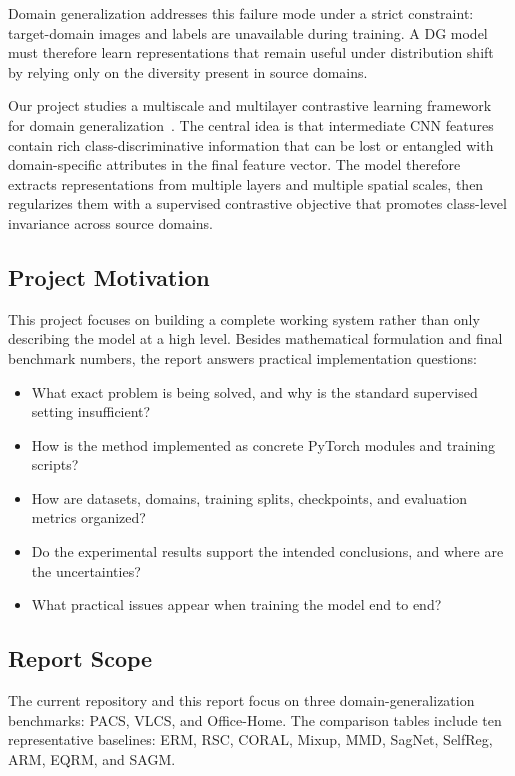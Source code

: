 \documentclass[11pt,a4paper]{article}
\begin{document}
Domain generalization addresses this failure mode under a strict constraint:
target-domain images and labels are unavailable during training.  A DG model must
therefore learn representations that remain useful under distribution shift by
relying only on the diversity present in source domains.

Our project studies a multiscale and multilayer contrastive learning framework
for domain generalization~\cite{ballas2024m2cl}.  The central idea is that
intermediate CNN features contain rich class-discriminative information that can
be lost or entangled with domain-specific attributes in the final feature vector.
The model therefore extracts representations from multiple layers and multiple
spatial scales, then regularizes them with a supervised contrastive objective that
promotes class-level invariance across source domains.

\subsection{Project Motivation}

This project focuses on building a complete working system rather than only
describing the model at a high level.  Besides mathematical formulation and final
benchmark numbers, the report answers practical implementation questions:

\begin{itemize}[leftmargin=1.4em]
  \item What exact problem is being solved, and why is the standard supervised
        setting insufficient?
  \item How is the method implemented as concrete PyTorch modules and training
        scripts?
  \item How are datasets, domains, training splits, checkpoints, and evaluation
        metrics organized?
  \item Do the experimental results support the intended conclusions, and where
        are the uncertainties?
  \item What practical issues appear when training the model end to end?
\end{itemize}

\subsection{Report Scope}

The current repository and this report focus on three domain-generalization
benchmarks: PACS, VLCS, and Office-Home.  The comparison tables include ten
representative baselines: ERM, RSC, CORAL, Mixup, MMD, SagNet, SelfReg, ARM,
EQRM, and SAGM.
\end{document}
